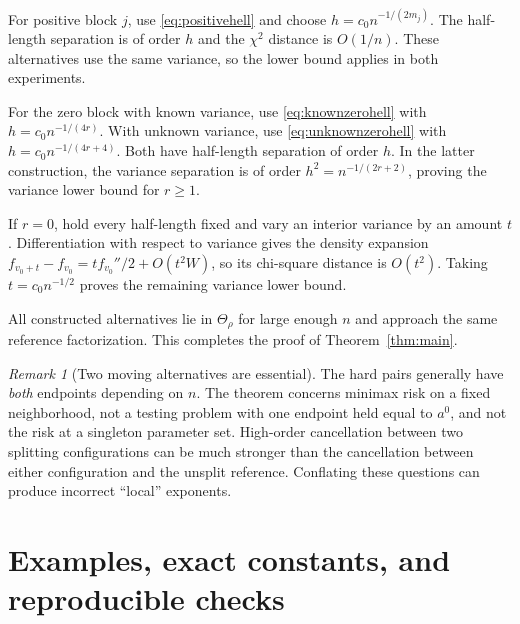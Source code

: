 \documentclass[11pt,a4paper]{article}
\numberwithin{equation}{section}
\theoremstyle{definition}
\theoremstyle{remark}
\newtheorem{remark}[theorem]{Remark}
\begin{document}
For positive block $j$, use \eqref{eq:positivehell} and choose
$h=c_0n^{-1/(2m_j)}$. The half-length separation is of order $h$ and the
$\chi^2$ distance is $O(1/n)$. These alternatives use the same variance, so
the lower bound applies in both experiments.

For the zero block with known variance, use \eqref{eq:knownzerohell} with
$h=c_0n^{-1/(4r)}$. With unknown variance, use
\eqref{eq:unknownzerohell} with $h=c_0n^{-1/(4r+4)}$.
Both have half-length separation of order $h$. In the latter construction,
the variance separation is of order $h^2=n^{-1/(2r+2)}$, proving the variance
lower bound for $r\ge1$.

If $r=0$, hold every half-length fixed and vary an interior variance by an
amount $t$. Differentiation with respect to variance gives the density
expansion $f_{v_0+t}-f_{v_0}=t f_{v_0}''/2+O(t^2W)$, so its chi-square
distance is $O(t^2)$. Taking $t=c_0n^{-1/2}$ proves the remaining variance
lower bound.

All constructed alternatives lie in $\Theta_\rho$ for large enough $n$ and
approach the same reference factorization. This completes the proof of
Theorem~\ref{thm:main}.

\begin{remark}[Two moving alternatives are essential]
The hard pairs generally have \emph{both} endpoints depending on $n$.
The theorem concerns minimax risk on a fixed neighborhood, not a testing
problem with one endpoint held equal to $a^0$, and not the risk at a singleton
parameter set. High-order cancellation between two splitting configurations
can be much stronger than the cancellation between either configuration and
the unsplit reference. Conflating these questions can produce incorrect
``local'' exponents.
\end{remark}

\section{Examples, exact constants, and reproducible checks}
\label{sec:examples}
\end{document}
